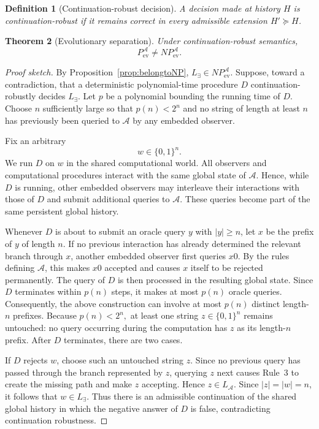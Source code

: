 \documentclass[11pt]{article}
\newtheorem{definition}{Definition}[section]
\newtheorem{theorem}[definition]{Theorem}
\newcommand{\Aev}{\mathcal A}
\begin{document}
\begin{definition}[Continuation-robust decision]
A decision made at history \(H\) is continuation-robust if it remains correct in every
admissible extension \(H'\succeq H\).
\end{definition}

\begin{theorem}[Evolutionary separation]\label{thm:evsep}
Under continuation-robust semantics,
\[
P_{\mathrm{ev}}^{\Aev}\neq NP_{\mathrm{ev}}^{\Aev}.
\]
\end{theorem}

\begin{proof}
[Proof sketch]
By Proposition~\ref{prop:belongtoNP}, \(L_{\exists}\in NP^{\Aev}_{\mathrm{ev}}\).  
 Suppose, toward a contradiction, that a deterministic polynomial-time procedure \(D\) continuation-robustly decides \(L_{\exists}\). Let \(p\) be a polynomial bounding the running time of \(D\). Choose \(n\) sufficiently large so that
 \( p(n)<2^n \) 
 and no string of length at least \(n\) has previously been queried to \(\Aev\) by any embedded observer. 
 
 Fix an arbitrary \[ w\in\{0,1\}^n. \] We run \(D\) on \(w\) in the shared computational world. All observers and computational procedures interact with the same global state of \(\Aev\). Hence, while \(D\) is running, other embedded observers may interleave their interactions with those of \(D\) and submit additional queries to \(\Aev\). These queries become part of the same persistent global history. 
 
 Whenever \(D\) is about to submit an oracle query \(y\) with \(|y|\ge n\), let \(x\) be the prefix of \(y\) of length \(n\). If no previous interaction has already determined the relevant branch through \(x\), another embedded observer first queries \(x0\). By the rules defining \(\Aev\), this makes \(x0\) accepted and causes \(x\) itself to be rejected permanently. The query of \(D\) is then processed in the resulting global state. Since \(D\) terminates within \(p(n)\) steps, it makes at most \(p(n)\) oracle queries. Consequently, the above construction can involve at most \(p(n)\) distinct length-\(n\) prefixes. Because \( p(n)<2^n, \) at least one string \( z\in\{0,1\}^n \) remains untouched: no query occurring during the computation has \(z\) as its length-\(n\) prefix. After \(D\) terminates, there are two cases.
 
 If \(D\) rejects \(w\), choose such an untouched string \(z\). Since no previous query has passed through the branch represented by \(z\), querying \(z\) next causes Rule~3 to create the missing path and make \(z\) accepting. Hence \( z\in L_{\Aev}. \) Since \(|z|=|w|=n\), it follows that \( w\in L_{\exists}. \) Thus there is an admissible continuation of the shared global history in which the negative answer of \(D\) is false, contradicting continuation robustness. 
 

\end{proof}
\end{document}
